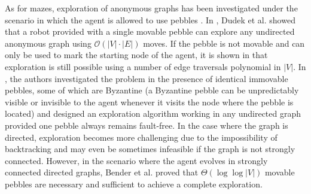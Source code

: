 \documentclass[11pt]{article}
\begin{document}
As for mazes, exploration of anonymous graphs has been investigated
under the scenario in which the agent is allowed to use pebbles
\cite{BenderFRSV02,ChalopinDK10,DieudonneP12,DudekJMW91}. In
\cite{DudekJMW91}, Dudek et al. showed that a robot provided with a
single movable pebble can explore any undirected anonymous graph using
$\mathcal{O}(|V|\cdot|E|)$ moves. If the pebble is not movable and can
only be used to mark the starting node of the agent, it is shown in
\cite{ChalopinDK10} that exploration is still possible using a number
of edge traversals polynomial in $|V|$. In \cite{DieudonneP12}, the
authors investigated the problem in the presence of identical
immovable pebbles, some of which are Byzantine (a Byzantine pebble can
be unpredictably visible or invisible to the agent whenever it visits
the node where the pebble is located) and designed an exploration
algorithm working in any undirected graph provided one pebble always remains
 fault-free. In the case where the graph is directed,
exploration becomes more challenging due to the impossibility of
backtracking and may even be sometimes infeasible if the graph is not
strongly connected. However, in the scenario where the agent evolves
in strongly connected directed graphs, Bender et al. proved that
$\Theta(\log \log |V|)$ movable pebbles are necessary and sufficient
to achieve a complete exploration.
\end{document}

